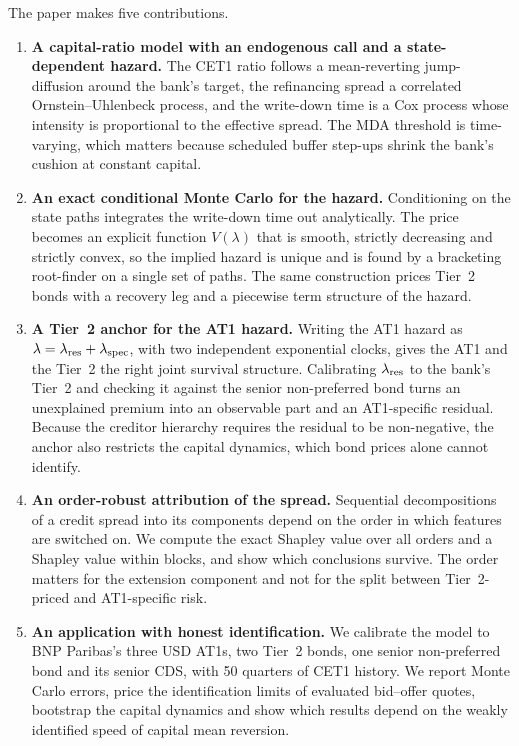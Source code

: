 The paper makes five contributions.
\begin{enumerate}
  \item \textbf{A capital-ratio model with an endogenous call and a state-dependent
  hazard.} The CET1 ratio follows a mean-reverting jump-diffusion around the bank's
  target, the refinancing spread a correlated Ornstein--Uhlenbeck process, and the
  write-down time is a Cox process whose intensity is proportional to the effective
  spread. The MDA threshold is time-varying, which matters because scheduled buffer
  step-ups shrink the bank's cushion at constant capital.
  \item \textbf{An exact conditional Monte Carlo for the hazard.} Conditioning on the
  state paths integrates the write-down time out analytically. The price becomes an
  explicit function $V(\lambda)$ that is smooth, strictly decreasing and strictly convex,
  so the implied hazard is unique and is found by a bracketing root-finder on a single
  set of paths. The same construction prices Tier~2 bonds with a recovery leg and a
  piecewise term structure of the hazard.
  \item \textbf{A Tier~2 anchor for the AT1 hazard.} Writing the AT1 hazard as
  $\lambda=\lambda_{\mathrm{res}}+\lambda_{\mathrm{spec}}$, with two independent exponential clocks, gives the AT1 and the
  Tier~2 the right joint survival structure. Calibrating $\lambda_{\mathrm{res}}$ to the bank's Tier~2 and
  checking it against the senior non-preferred bond turns an unexplained premium into an
  observable part and an AT1-specific residual. Because the creditor hierarchy requires
  the residual to be non-negative, the anchor also restricts the capital dynamics, which
  bond prices alone cannot identify.
  \item \textbf{An order-robust attribution of the spread.} Sequential decompositions of
  a credit spread into its components depend on the order in which features are switched
  on. We compute the exact Shapley value over all orders and a Shapley value within
  blocks, and show which conclusions survive. The order matters for the extension
  component and not for the split between Tier~2-priced and AT1-specific risk.
  \item \textbf{An application with honest identification.} We calibrate the model to
  BNP Paribas's three USD AT1s, two Tier~2 bonds, one senior non-preferred bond and its
  senior CDS, with 50 quarters of CET1 history. We report Monte Carlo errors, price the
  identification limits of evaluated bid--offer quotes, bootstrap the capital dynamics
  and show which results depend on the weakly identified speed of capital mean
  reversion.
\end{enumerate}


